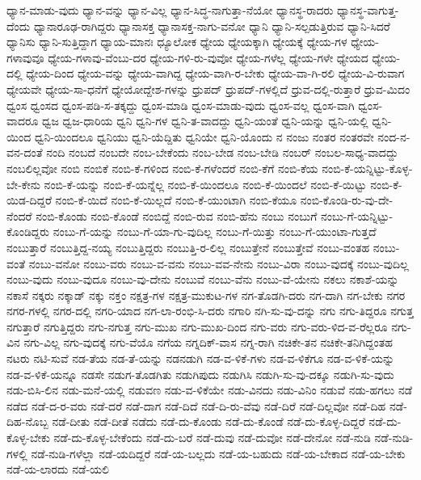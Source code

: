 {ಧ್ಯಾನ-ಮಾಡು-ವುದು
ಧ್ಯಾನ-ವನ್ನು
ಧ್ಯಾನ-ವಿಲ್ಲ
ಧ್ಯಾನ-ಸಿದ್ಧ-ನಾಗುತ್ತಾ-ನೆಯೋ
ಧ್ಯಾನಸ್ಥ-ರಾದರು
ಧ್ಯಾನಸ್ಥ-ವಾಗುತ್ತ-ದೆಂದು
ಧ್ಯಾನಾರೂಢ-ರಾಗಿದ್ದರು
ಧ್ಯಾನಾಸಕ್ತ
ಧ್ಯಾನಾಸಕ್ತ-ನಾಗು-ವನೋ
ಧ್ಯಾನಿ
ಧ್ಯಾನಿ-ಸಲ್ಪಡುತ್ತಿರುವ
ಧ್ಯಾನಿ-ಸಿದರೆ
ಧ್ಯಾನಿಸು
ಧ್ಯಾನಿ-ಸುತ್ತಿದ್ದಾಗ
ಧ್ಯಾಯ-ಮಾನಃ
ಧ್ಯೂಲೋಕ
ಧ್ಯೇಯ
ಧ್ಯೇಯಕ್ಕಾಗಿ
ಧ್ಯೇಯಕ್ಕೆ
ಧ್ಯೇಯ-ಗಳ
ಧ್ಯೇಯ-ಗಳಾವುವೂ
ಧ್ಯೇಯ-ಗಳಾವು-ವೆಂಬು-ದರ
ಧ್ಯೇಯ-ಗಳಿ-ರು-ವುವೋ
ಧ್ಯೇಯ-ಗಳೆಲ್ಲ
ಧ್ಯೇಯ-ಗಳೇ
ಧ್ಯೇಯದ
ಧ್ಯೇಯ-ದಲ್ಲಿ
ಧ್ಯೇಯ-ದಿಂದ
ಧ್ಯೇಯ-ವನ್ನು
ಧ್ಯೇಯ-ವಾಗಿದ್ದ
ಧ್ಯೇಯ-ವಾಗಿ-ರ-ಬೇಕು
ಧ್ಯೇಯ-ವಾ-ಗಿ-ರಲಿ
ಧ್ಯೇಯ-ವಿ-ರುವಾಗ
ಧ್ಯೇಯವೇ
ಧ್ಯೇಯ-ಸಾ-ಧನೆಗೆ
ಧ್ಯೇಯೋದ್ದೇಶ-ಗಳನ್ನು
ಧ್ರುಪದ್
ಧ್ರುಪದ್-ಗಳಲ್ಲಿದೆ
ಧ್ರುವ-ದಲ್ಲಿ-ರುತ್ತಾರೆ
ಧ್ರುವ-ಮಿದಂ
ಧ್ವಂಸ
ಧ್ವಂಸದ
ಧ್ವಂಸ-ಪಡಿ-ಸ-ತಕ್ಕದ್ದು
ಧ್ವಂಸ-ಮಾಡಿ
ಧ್ವಂಸ-ಮಾಡು-ವುದು
ಧ್ವಂಸ-ವಲ್ಲ
ಧ್ವಂಸ-ವಾಗಿ
ಧ್ವಂಸ-ವಾದರೂ
ಧ್ವಜ
ಧ್ವಜ-ಧಾರಿಯ
ಧ್ವನಿ
ಧ್ವನಿ-ಗಳ
ಧ್ವನಿ-ತ-ವಾದದ್ದು
ಧ್ವನಿ-ಯಂತೆ
ಧ್ವನಿ-ಯನ್ನು
ಧ್ವನಿ-ಯಲ್ಲಿ
ಧ್ವನಿ-ಯಿಂದ
ಧ್ವನಿ-ಯಿಂದಲೂ
ಧ್ವನಿಯು
ಧ್ವನಿ-ಯೆದ್ದಿತು
ಧ್ವನಿಯೇ
ಧ್ವನಿ-ಯೊಂದು
ನ
ನಂಜು
ನಂತರ
ನಂತರವೇ
ನಂದ-ನ-ವನ-ದಂತೆ
ನಂದಿ
ನಂಬದೆ
ನಂಬದೇ
ನಂಬ-ಬೇಕೆಂದು
ನಂಬ-ಬೇಡ
ನಂಬ-ಬೇಡಿ
ನಂಬರ್
ನಂಬಲ-ಸಾಧ್ಯ-ವಾದದ್ದು
ನಂಬಲಿಲ್ಲವೋ
ನಂಬಿ
ನಂಬಿಕೆ
ನಂಬಿ-ಕೆ-ಗಳಿಂದ
ನಂಬಿ-ಕೆ-ಗಳೆಂದರೆ
ನಂಬಿ-ಕೆಗೆ
ನಂಬಿ-ಕೆಯ
ನಂಬಿ-ಕೆ-ಯನ್ನಿಟ್ಟು-ಕೊಳ್ಳ-ಬೇ-ಕೇನು
ನಂಬಿ-ಕೆ-ಯನ್ನು
ನಂಬಿ-ಕೆ-ಯನ್ನೆಲ್ಲ
ನಂಬಿ-ಕೆ-ಯಿಂದಲೂ
ನಂಬಿ-ಕೆ-ಯಿಂದಲೆ
ನಂಬಿ-ಕೆ-ಯಿಟ್ಟು
ನಂಬಿ-ಕೆ-ಯಿಡ-ದಿದ್ದರೆ
ನಂಬಿ-ಕೆ-ಯಿದೆ
ನಂಬಿ-ಕೆ-ಯಿಲ್ಲದೆ
ನಂಬಿ-ಕೆ-ಯುಂಟಾಗಿ
ನಂಬಿ-ಕೆಯೂ
ನಂಬಿ-ಕೊಂಡಿ-ರು-ವು-ದೇ-ನೆಂದರೆ
ನಂಬಿ-ಕೊಂಡು
ನಂಬಿ-ಕೊಂಡೆ
ನಂಬಿದ್ದೆ
ನಂಬಿ-ರುವ
ನಂಬಿ-ಹೆನು
ನಂಬು
ನಂಬುಗೆ
ನಂಬು-ಗೆ-ಯನ್ನಿಟ್ಟು-ಕೊಂಡಿದ್ದರು
ನಂಬು-ಗೆ-ಯನ್ನು
ನಂಬು-ಗೆ-ಯಾ-ಗು-ವುದಿಲ್ಲ
ನಂಬು-ಗೆ-ಯಿತ್ತು
ನಂಬು-ಗೆ-ಯುಂಟಾ-ಗುತ್ತದೆ
ನಂಬುತ್ತಾರೆ
ನಂಬುತ್ತಿದ್ದ-ನಯ್ಯ
ನಂಬುತ್ತಿದ್ದರು
ನಂಬುತ್ತಿ-ರ-ಲಿಲ್ಲ
ನಂಬುತ್ತೇನೆ
ನಂಬುತ್ತೇವೆ
ನಂಬು-ವಂತಹ
ನಂಬು-ವಂತೆ
ನಂಬು-ವನೋ
ನಂಬು-ವರು
ನಂಬು-ವ-ವನು
ನಂಬು-ವವ-ನೇನು
ನಂಬು-ವಿರಾ
ನಂಬು-ವುದಕ್ಕೆ
ನಂಬು-ವುದಿಲ್ಲ
ನಂಬು-ವುದು
ನಂಬು-ವುದೂ
ನಂಬು-ವು-ದೇನು
ನಂಬುವೆ
ನಂಬು-ವೆನು
ನಂಬು-ವೆ-ಯೇನು
ನಕಲು
ನಕಾಶೆ-ಯನ್ನು
ನಕಾಸೆ
ನಕ್ಕರು
ನಕ್ಕಾಡ್
ನಕ್ಕು
ನಕ್ತಂ
ನಕ್ಷತ್ರ-ಗಳ
ನಕ್ಷತ್ರ-ಮುಕುಟ-ಗಳ
ನಗ-ತೊಡಗಿ-ದರು
ನಗ-ದಾಗಿ
ನಗ-ಬೇಕು
ನಗರ
ನಗರ-ಗಳಲ್ಲಿ
ನಗರ-ದಲ್ಲಿ
ನಗರಿ-ಯಾದ
ನಗ-ಲಾ-ರಂಭಿ-ಸಿ-ದರು
ನಗಾರಿ
ನಗಿ-ಸು-ವು-ದನ್ನು
ನಗು
ನಗು-ತಿದ್ದರೂ
ನಗುತ್ತ
ನಗುತ್ತಾರೆ
ನಗುತ್ತಿದ್ದರು
ನಗು-ನಗುತ್ತ
ನಗು-ಮುಖ
ನಗು-ಮುಖ-ದಿಂದ
ನಗು-ವರು
ನಗು-ವರು-ಳಿದ-ವ-ರೆಲ್ಲರೂ
ನಗು-ವಿನ
ನಗು-ವಿಲ್ಲ
ನಗು-ವುದಕ್ಕೆ
ನಗು-ವೆಯೊ
ನಗೆಯ
ನಗ್ನದಿಕ್-ವಾಸ
ನಗ್ನ-ರಾಗಿ
ನಚಿಕೇ-ತನ
ನಚಿಕೇ-ತನಿಗಿದ್ದಂತಹ
ನಟರು
ನಟಿ-ಸುವೆ
ನಡ-ತೆಯ
ನಡ-ತೆ-ಯನ್ನು
ನಡನಡುಗಿ
ನಡ-ವ-ಳಿಕೆ-ಗಳು
ನಡ-ವ-ಳಿಕೆಗೂ
ನಡ-ವ-ಳಿಕೆ-ಯನ್ನು
ನಡ-ವ-ಳಿಕೆ-ಯನ್ನೂ
ನಡಸೇ
ನಡುಗ-ತೊಡಗಿತು
ನಡುಗಿಪುದು
ನಡುಗಿಸಿ
ನಡುಗಿ-ಸು-ವು-ದಕ್ಕೂ
ನಡುಗಿ-ಸು-ವುದು
ನಡು-ಬಿಸಿ-ಲಿನ
ನಡು-ಮನೆ-ಯಲ್ಲಿ
ನಡುವಣ
ನಡು-ವ-ಳಿಕೆಯೇ
ನಡು-ವಿನದು
ನಡು-ವಿನಿಂ
ನಡುವೆ
ನಡು-ಹಗಲು
ನಡೆ
ನಡೆದ
ನಡೆ-ದ-ರ-ವರು
ನಡೆ-ದರೆ
ನಡೆ-ದಾಗ
ನಡೆ-ದಿದೆ
ನಡೆ-ದಿ-ರು-ವೆವು
ನಡೆ-ದಿರೆ
ನಡೆ-ದಿಲ್ಲವೋ
ನಡೆ-ದಿಹ
ನಡೆ-ದಿಹ-ನೊಬ್ಬ
ನಡೆ-ದೀತು
ನಡೆ-ದೀತೆ
ನಡೆದು
ನಡೆ-ದು-ಕೊಂಡು
ನಡೆ-ದು-ಕೊಂಡೆ
ನಡೆ-ದು-ಕೊಳ್ಳ-ದಿದ್ದರೆ
ನಡೆ-ದು-ಕೊಳ್ಳ-ಬೇಕು
ನಡೆ-ದು-ಕೊಳ್ಳ-ಬೇಕೆಂದು
ನಡೆ-ದು-ಬರೆ
ನಡೆ-ದುವು
ನಡೆ-ದುವೋ
ನಡೆ-ದೇನೋ
ನಡೆ-ನುಡಿ
ನಡೆ-ನುಡಿ-ಗಳಲ್ಲಿ
ನಡೆ-ನುಡಿ-ಗಳೆಲ್ಲಾ
ನಡೆ-ಯದಿದ್ದರೆ
ನಡೆ-ಯ-ಬಲ್ಲದು
ನಡೆ-ಯ-ಬಹುದು
ನಡೆ-ಯ-ಬೇಕಾದ
ನಡೆ-ಯ-ಬೇಕು
ನಡೆ-ಯ-ಲಾರದು
ನಡೆ-ಯಲಿ
}
